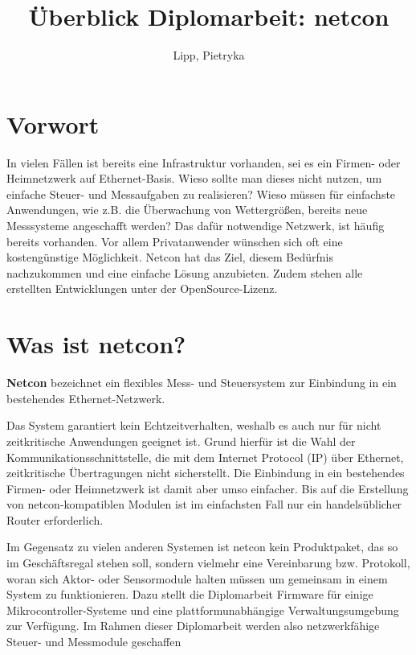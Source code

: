 \documentclass[a4paper,14pt,headsepline]{scrartcl}
\begin{document}
\author{Lipp, Pietryka} 
\title{Überblick \linebreak Diplomarbeit: netcon} 
\date{} 
\maketitle



\newpage

\section*{Vorwort}
In vielen Fällen ist bereits eine Infrastruktur vorhanden, sei es ein Firmen- oder Heimnetzwerk auf Ethernet-Basis. Wieso sollte man dieses nicht nutzen, um einfache Steuer- und Messaufgaben zu realisieren? Wieso müssen für einfachste Anwendungen, wie z.B. die Überwachung von Wettergrößen, bereits neue Messsysteme angeschafft werden? Das dafür notwendige Netzwerk, ist häufig bereits vorhanden. Vor allem Privatanwender wünschen sich oft eine kostengünstige Möglichkeit. Netcon hat das Ziel, diesem Bedürfnis nachzukommen und eine einfache Lösung anzubieten. Zudem stehen alle erstellten Entwicklungen unter der OpenSource-Lizenz. 

\tableofcontents


\newpage
\section{Was ist netcon?}

\textbf{Netcon} bezeichnet ein flexibles Mess- und Steuersystem zur Einbindung in ein bestehendes Ethernet-Netzwerk. 

Das System garantiert kein Echtzeitverhalten, weshalb es auch nur für nicht zeitkritische Anwendungen geeignet ist. Grund hierfür ist die Wahl der Kommunikationsschnittstelle, die mit dem Internet Protocol (IP) über Ethernet, zeitkritische Übertragungen nicht sicherstellt. Die Einbindung in ein bestehendes Firmen- oder Heimnetzwerk ist damit aber umso einfacher. Bis auf die Erstellung von netcon-kompatiblen Modulen ist im einfachsten Fall nur ein handelsüblicher Router erforderlich.

Im Gegensatz zu vielen anderen Systemen ist netcon kein Produktpaket, das so im Geschäftsregal stehen soll, sondern vielmehr eine Vereinbarung bzw. Protokoll, woran sich Aktor- oder Sensormodule halten müssen um gemeinsam in einem System zu funktionieren. Dazu stellt die Diplomarbeit Firmware für einige Mikrocontroller-Systeme und eine plattformunabhängige Verwaltungsumgebung zur Verfügung. Im Rahmen dieser Diplomarbeit werden also netzwerkfähige Steuer- und Messmodule geschaffen
\end{document}
